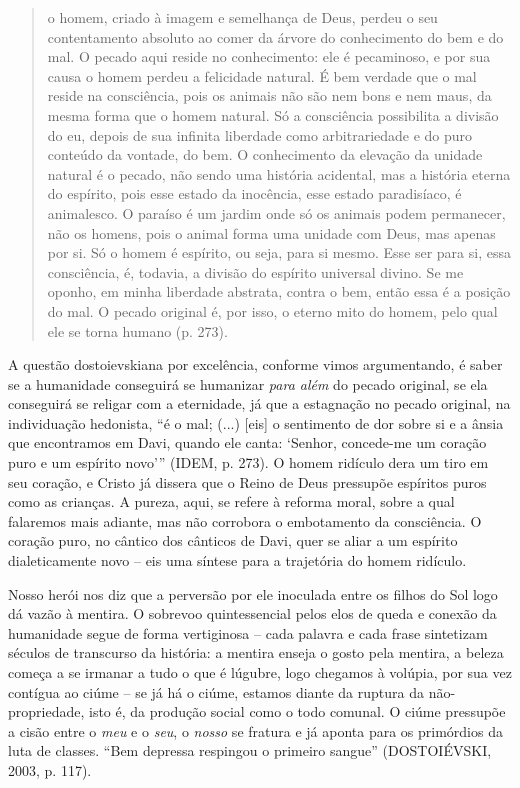 \begin{quote}
o homem, criado à imagem e semelhança de Deus, perdeu o seu
contentamento absoluto ao comer da árvore do conhecimento do bem e do
mal. O pecado aqui reside no conhecimento: ele é pecaminoso, e por sua
causa o homem perdeu a felicidade natural. É bem verdade que o mal
reside na consciência, pois os animais não são nem bons e nem maus, da
mesma forma que o homem natural. Só a consciência possibilita a divisão
do eu, depois de sua infinita liberdade como arbitrariedade e do puro
conteúdo da vontade, do bem. O conhecimento da elevação da unidade
natural é o pecado, não sendo uma história acidental, mas a história
eterna do espírito, pois esse estado da inocência, esse estado
paradisíaco, é animalesco. O paraíso é um jardim onde só os animais
podem permanecer, não os homens, pois o animal forma uma unidade com
Deus, mas apenas por si. Só o homem é espírito, ou seja, para si mesmo.
Esse ser para si, essa consciência, é, todavia, a divisão do espírito
universal divino. Se me oponho, em minha liberdade abstrata, contra o
bem, então essa é a posição do mal. O pecado original é, por isso, o
eterno mito do homem, pelo qual ele se torna humano (p. 273).
\end{quote}

A questão dostoievskiana por excelência, conforme vimos argumentando, é
saber se a humanidade conseguirá se humanizar \emph{para além} do pecado
original, se ela conseguirá se religar com a eternidade, já que a
estagnação no pecado original, na individuação hedonista, ``é o mal;
(...) {[}eis{]} o sentimento de dor sobre si e a ânsia que encontramos
em Davi, quando ele canta: `Senhor, concede-me um coração puro e um
espírito novo''' (IDEM, p. 273). O homem ridículo dera um tiro em seu
coração, e Cristo já dissera que o Reino de Deus pressupõe espíritos
puros como as crianças. A pureza, aqui, se refere à reforma moral, sobre
a qual falaremos mais adiante, mas não corrobora o embotamento da
consciência. O coração puro, no cântico dos cânticos de Davi, quer se
aliar a um espírito dialeticamente novo -- eis uma síntese para a
trajetória do homem ridículo.

Nosso herói nos diz que a perversão por ele inoculada entre os filhos do
Sol logo dá vazão à mentira. O sobrevoo quintessencial pelos elos de
queda e conexão da humanidade segue de forma vertiginosa -- cada palavra
e cada frase sintetizam séculos de transcurso da história: a mentira
enseja o gosto pela mentira, a beleza começa a se irmanar a tudo o que é
lúgubre, logo chegamos à volúpia, por sua vez contígua ao ciúme -- se já
há o ciúme, estamos diante da ruptura da não-propriedade, isto é, da
produção social como o todo comunal. O ciúme pressupõe a cisão entre o
\emph{meu} e o \emph{seu}, o \emph{nosso} se fratura e já aponta para os
primórdios da luta de classes. ``Bem depressa respingou o primeiro
sangue'' (DOSTOIÉVSKI, 2003, p. 117).

